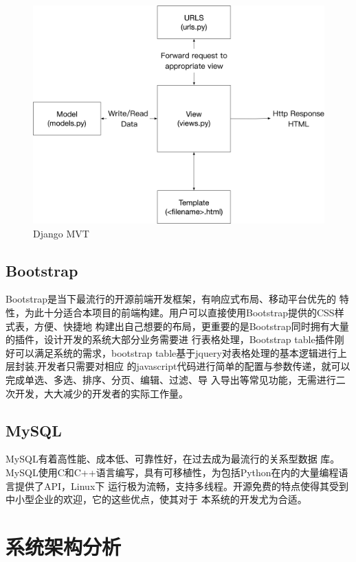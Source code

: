 \documentclass{ede}
\begin{document}
\begin{figure}%
  \centering
  \includegraphics [width=.8\columnwidth]{./img/djangoMVT}      
  \caption{Django MVT}\label{fig:mvt}
\end{figure}

\subsection{Bootstrap}

Bootstrap\cite{汪红宇2017基于}是当下最流行的开源前端开发框架，有响应式布局、移动平台优先的
特性，为此十分适合本项目的前端构建。用户可以直接使用Bootstrap提供的CSS样式表，方便、快捷地
构建出自己想要的布局，更重要的是Bootstrap同时拥有大量的插件，设计开发的系统大部分业务需要进
行表格处理，Bootstrap table插件刚好可以满足系统的需求，bootstrap
table基于jquery\cite{Franklin2017Ajax}对表格处理的基本逻辑进行上层封装,开发者只需要对相应
的javascript代码进行简单的配置与参数传递，就可以完成单选、多选、排序、分页、编辑、过滤、导
入导出等常见功能，无需进行二次开发，大大减少的开发者的实际工作量。

\subsection{MySQL}

MySQL\cite{苟文博2017基于}有着高性能、成本低、可靠性好，在过去成为最流行的关系型数据
库。MySQL使用C和C++语言编写，具有可移植性，为包括Python在内的大量编程语言提供了API，Linux下
运行极为流畅，支持多线程。开源免费的特点使得其受到中小型企业的欢迎，它的这些优点，使其对于
本系统的开发尤为合适。

\section{系统架构分析}
\end{document}
